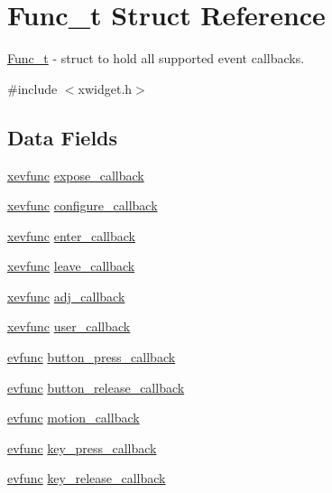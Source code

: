 \hypertarget{structFunc__t}{}\section{Func\+\_\+t Struct Reference}
\label{structFunc__t}


\hyperlink{structFunc__t}{Func\+\_\+t} -\/ struct to hold all supported event callbacks.  




{\ttfamily \#include $<$xwidget.\+h$>$}

\subsection*{Data Fields}
\begin{DoxyCompactItemize}
\item 
\hyperlink{xwidget_8h_a9ef0263424a7f5f8f6b02055fca67ddd}{xevfunc} \hyperlink{structFunc__t_ae4ba307ec29bfea83e1197aa750c1396}{expose\+\_\+callback}
\item 
\hyperlink{xwidget_8h_a9ef0263424a7f5f8f6b02055fca67ddd}{xevfunc} \hyperlink{structFunc__t_a7876670d3bb74b11ab93fe81908d04b0}{configure\+\_\+callback}
\item 
\hyperlink{xwidget_8h_a9ef0263424a7f5f8f6b02055fca67ddd}{xevfunc} \hyperlink{structFunc__t_a6ae24f219bf8eff4bd5fbdfa3f29c14d}{enter\+\_\+callback}
\item 
\hyperlink{xwidget_8h_a9ef0263424a7f5f8f6b02055fca67ddd}{xevfunc} \hyperlink{structFunc__t_a1801ba902bd7efc706d474312f960d0a}{leave\+\_\+callback}
\item 
\hyperlink{xwidget_8h_a9ef0263424a7f5f8f6b02055fca67ddd}{xevfunc} \hyperlink{structFunc__t_afe804d94b970050a9f85530408169623}{adj\+\_\+callback}
\item 
\hyperlink{xwidget_8h_a9ef0263424a7f5f8f6b02055fca67ddd}{xevfunc} \hyperlink{structFunc__t_a1f089cb13a39764a1f980470a51db71b}{user\+\_\+callback}
\item 
\hyperlink{xwidget_8h_ab4ae973f86a383c8c0f92b709044520a}{evfunc} \hyperlink{structFunc__t_aa58bc35a1499d8cd850d2a083ad016f1}{button\+\_\+press\+\_\+callback}
\item 
\hyperlink{xwidget_8h_ab4ae973f86a383c8c0f92b709044520a}{evfunc} \hyperlink{structFunc__t_a8cb9d8135a178027675c96599ff8312e}{button\+\_\+release\+\_\+callback}
\item 
\hyperlink{xwidget_8h_ab4ae973f86a383c8c0f92b709044520a}{evfunc} \hyperlink{structFunc__t_ac2842c834907f4aeace8f404c6cc7621}{motion\+\_\+callback}
\item 
\hyperlink{xwidget_8h_ab4ae973f86a383c8c0f92b709044520a}{evfunc} \hyperlink{structFunc__t_a024ea4919029156d9415f1501cd8b0bf}{key\+\_\+press\+\_\+callback}
\item 
\hyperlink{xwidget_8h_ab4ae973f86a383c8c0f92b709044520a}{evfunc} \hyperlink{structFunc__t_a8c7138616caa404a9af064d673d7e0f8}{key\+\_\+release\+\_\+callback}
\end{DoxyCompactItemize}


